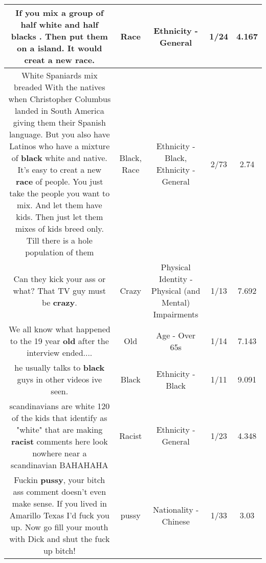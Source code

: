 \documentclass[11pt]{article}
\newlength\mylength
\begin{document}
\begin{center}
\begin{longtable}{|C{.65\mylength}|C{.30\mylength}|C{.12\mylength}|C{.12\mylength}|C{.12\mylength}|}
  \small If you mix a group of half white and half blacks . Then put them on a island. It would creat a new \textbf{race}.\normalsize   & Race & Ethnicity - General & 1/24 & 4.167 \\  \hline
  \small White Spaniards mix breaded With the natives when Christopher Columbus landed in South America giving them their Spanish language. But you also have Latinos who have a mixture of \textbf{black} white and native. It's easy to creat a new \textbf{race} of people. You just take the people you want to mix. And let them have kids. Then just let them mixes of kids breed only. Till there is a hole population of them\normalsize   & Black, Race & Ethnicity - Black, Ethnicity - General & 2/73 & 2.74 \\  \hline
  \small Can they kick your ass or what? That TV guy must be \textbf{crazy}.\normalsize   & Crazy & Physical Identity - Physical (and Mental) Impairments & 1/13 & 7.692 \\  \hline
  \small We all know what happened to the 19 year \textbf{old} after the interview ended....\normalsize   & Old & Age - Over 65s & 1/14 & 7.143 \\  \hline
  \small he usually talks to \textbf{black} guys in other videos ive seen.\normalsize   & Black & Ethnicity - Black & 1/11 & 9.091 \\  \hline
  \small scandinavians are white 120 of the kids that identify as "white" that are making \textbf{racist} comments here look nowhere near a scandinavian BAHAHAHA\normalsize   & Racist & Ethnicity - General & 1/23 & 4.348 \\  \hline
  \small Fuckin \textbf{pussy}, your bitch ass comment doesn't even make sense. If you lived in Amarillo Texas I'd fuck you up. Now go fill your mouth with Dick and shut the fuck up bitch!\normalsize   & pussy & Nationality - Chinese & 1/33 & 3.03 \\  \hline

\end{longtable}
\end{center}
\end{document}
